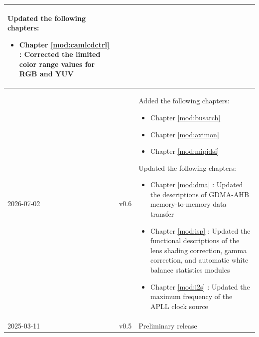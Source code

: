 \begin{longtable}[l]{ | m{2cm} | m{1.5cm} | m{12cm} | }
    Updated the following chapters:
    \begin{itemize}
        \item Chapter \ref{mod:camlcdctrl} \textit{\nameref{mod:camlcdctrl}}: Corrected the limited color range values for RGB and YUV
    \end{itemize}
    \\\hline
    2026-07-02 & v0.6 & Added the following chapters:
    \begin{itemize}
        \item Chapter \ref{mod:busarch} \textit{\nameref{mod:busarch}}
        \item Chapter \ref{mod:aximon} \textit{\nameref{mod:aximon}}
        \item Chapter \ref{mod:mipidsi} \textit{\nameref{mod:mipidsi}}
    \end{itemize}

    Updated the following chapters:
    \begin{itemize}
        \item Chapter \ref{mod:dma} \textit{\nameref{mod:dma}}: Updated the descriptions of GDMA-AHB memory-to-memory data transfer %
        \item Chapter \ref{mod:isp} \textit{\nameref{mod:isp}}: Updated the functional descriptions of the lens shading correction, gamma correction, and automatic white balance statistics modules %
        \item Chapter \ref{mod:i2s} \textit{\nameref{mod:i2s}}: Updated the maximum frequency of the APLL clock source %
    \end{itemize}
    \\\hline
    2025-03-11 & v0.5 & Preliminary release\\\hline

\end{longtable}
